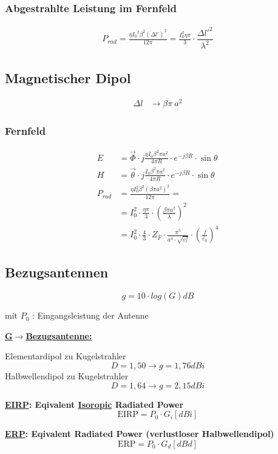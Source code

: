 \subsubsection{Abgestrahlte Leistung im Fernfeld}
\begin{align*}
    P_{rad} = \frac{\eta {I_0}^2 \beta^2 (\Delta l')^2}{12\pi} = \frac{I_0^2\eta\pi}{3}\cdot \dfrac{\Delta l'^2}{\lambda^2}
\end{align*}

\subsection{Magnetischer Dipol}
\begin{align*}
    \Delta l & \rightarrow \beta\pi\ a^2
\end{align*}

\subsubsection{Fernfeld}
\begin{align*}
    E       & = \vec{\Phi}\cdot j\frac{\eta I_0\beta^2\pi a^2}{4\pi R}\cdot e^{-j\beta R}\cdot\sin\theta              \\
    H       & = \vec{\theta}\cdot j\frac{I_0\beta^2\pi a^2}{4\pi R}\cdot e^{-j\beta R}\cdot\sin\theta                 \\
    P_{rad} & = \frac{\eta I_0^2\beta^2(\beta\pi a^2)^2}{12\pi}=                                                      \\
            & = I_0^2\cdot\frac{\eta\pi}{3}\cdot(\frac{\beta\pi a^2}{\lambda})^2                                      \\
            & = I_0^2\cdot\frac{4}{3}\cdot Z_F\cdot\frac{\pi^5}{a^4\cdot\sqrt{\varepsilon_r^3}}\cdot(\frac{f}{c_0})^4
\end{align*}

\subsection{Bezugsantennen}
\[
    \boxed{g = 10 \cdot log(G)dB}
\]

mit $P_0$ : Eingangsleistung der Antenne

\begin{description}
    \item \textbf{\underline{G$\rightarrow$Bezugsantenne:}}

          Elementardipol  zu Kugelstrahler \[D = 1,50 \rightarrow g = 1,76\si{dBi}\]
          Halbwellendipol zu Kugelstrahler \[D = 1,64 \rightarrow g = 2,15\si{dBi}\]

    \item \textbf{\underline{EIRP}: Eqivalent \underline{Isoropic} Radiated Power}
          \[
              \text{EIRP} = P_0 \cdot G_i [dBi]
          \]

    \item \textbf{\underline{ERP}: Eqivalent Radiated Power (verlustloser Halbwellendipol)}
          \[
              \text{ERP} = P_0 \cdot G_d [dBd]
          \]
\end{description}


